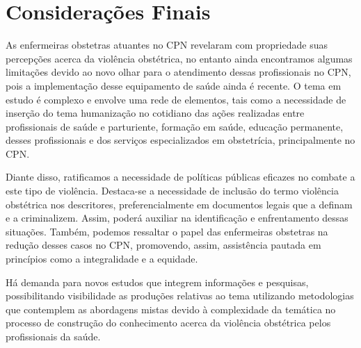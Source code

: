 \chapter{Considerações Finais}
\label{chap:conclusoes-e-trabalhos-futuros}

As enfermeiras obstetras atuantes no CPN revelaram com propriedade suas percepções acerca da violência obstétrica, no entanto ainda encontramos algumas limitações devido ao novo olhar para o atendimento dessas profissionais no CPN, pois a implementação desse equipamento de saúde ainda é recente. O tema em estudo é complexo e envolve uma rede de elementos, tais como a necessidade de inserção do tema humanização no cotidiano das ações realizadas entre profissionais de saúde e parturiente, formação em saúde, educação permanente, desses profissionais e dos serviços especializados em obstetrícia, principalmente no CPN.

Diante disso, ratificamos a necessidade de políticas públicas eficazes no combate a este tipo de violência. Destaca-se a necessidade de inclusão do termo violência obstétrica nos descritores, preferencialmente em documentos legais que a definam e a criminalizem. Assim, poderá auxiliar na identificação e enfrentamento dessas situações. Também, podemos ressaltar o papel das enfermeiras obstetras na redução desses casos no CPN, promovendo, assim, assistência pautada em princípios como a integralidade e a equidade. 

Há demanda para novos estudos que integrem informações e pesquisas, possibilitando visibilidade as produções relativas ao tema utilizando metodologias que contemplem as abordagens mistas devido à complexidade da temática no processo de construção do conhecimento acerca da violência obstétrica pelos profissionais da saúde.
